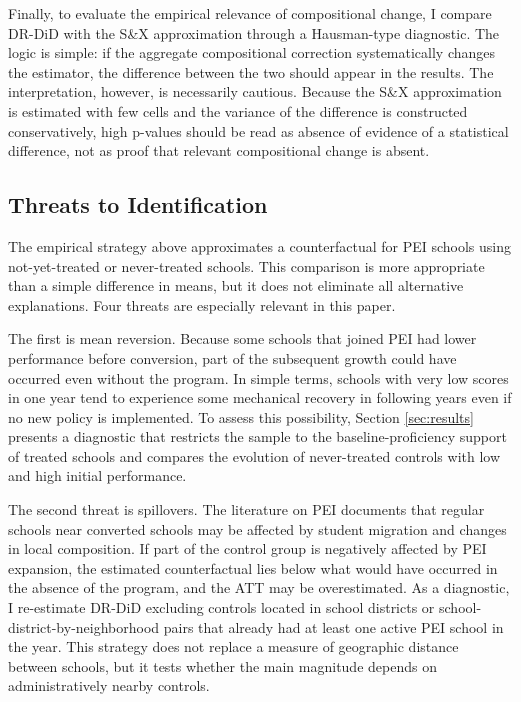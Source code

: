 Finally, to evaluate the empirical relevance of compositional change, I compare DR-DiD with the S\&X approximation through a Hausman-type diagnostic. The logic is simple: if the aggregate compositional correction systematically changes the estimator, the difference between the two should appear in the results. The interpretation, however, is necessarily cautious. Because the S\&X approximation is estimated with few cells and the variance of the difference is constructed conservatively, high p-values should be read as absence of evidence of a statistical difference, not as proof that relevant compositional change is absent.

\subsection{Threats to Identification} \label{sec:identification_threats}

The empirical strategy above approximates a counterfactual for PEI schools using not-yet-treated or never-treated schools. This comparison is more appropriate than a simple difference in means, but it does not eliminate all alternative explanations. Four threats are especially relevant in this paper.

The first is mean reversion. Because some schools that joined PEI had lower performance before conversion, part of the subsequent growth could have occurred even without the program. In simple terms, schools with very low scores in one year tend to experience some mechanical recovery in following years even if no new policy is implemented. To assess this possibility, Section \ref{sec:results} presents a diagnostic that restricts the sample to the baseline-proficiency support of treated schools and compares the evolution of never-treated controls with low and high initial performance.

The second threat is spillovers. The literature on PEI documents that regular schools near converted schools may be affected by student migration and changes in local composition. If part of the control group is negatively affected by PEI expansion, the estimated counterfactual lies below what would have occurred in the absence of the program, and the ATT may be overestimated. As a diagnostic, I re-estimate DR-DiD excluding controls located in school districts or school-district-by-neighborhood pairs that already had at least one active PEI school in the year. This strategy does not replace a measure of geographic distance between schools, but it tests whether the main magnitude depends on administratively nearby controls.

